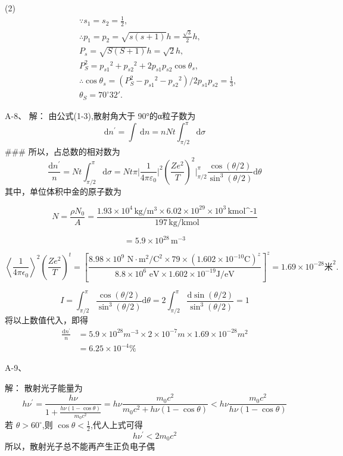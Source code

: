 \documentclass{article}
\begin{document}
\begin{CJK*}{UTF8}{gbsn}
(2)
\begin{align*}
&\because s_{1}=s_{2}=\frac{1}{2}, \\
&\therefore p_{1}=p_{2}=\sqrt{s(s+1)}h=\frac{\sqrt{3}}{2}h, \\
&P_{s}=\sqrt{S(S+1)}h=\sqrt{2}h, \\
&P_{S}^{2}={p_{s1}}^{2}+{p_{s2}}^{2}+2p_{s1}p_{s2}\cos\theta_{s}, \\
&\therefore\cos\theta_{s}=(P_{S}^{2}-{p_{s1}}^{2}-{p_{s2}}^{2})/2p_{s1}p_{s2}=\frac{1}{3}, \\
&\theta_{S}=70^{\circ}32'.
\end{align*}

A-8、
解： 由公式(1-3),散射角大于 90°的α粒子数为
$$\mathrm{d}n^{\prime}=\int\:\mathrm{d}n=nNt\int_{\pi/2}^{\pi}\mathrm{d}\sigma $$
### 所以，占总数的相对数为
$$\frac{\mathrm{d}n^{\prime}}{n}=Nt\int_{\pi/2}^{\pi}\mathrm{d}\sigma=Nt\pi\Big|\frac{1}{4\pi\varepsilon_{0}}\Big|^{2}(\frac{Ze^{2}}{T})^{2}\Big|_{\pi/2}^{\pi}\frac{\cos(\theta/2)}{\sin^{3}(\theta/2)}\mathrm{d}\theta $$
其中，单位体积中金的原子数为

\[ N = \frac{\rho N_{0}}{A} = \frac{1.93 \times 10^{4} \, \text{kg} / \text{m}^{3} \times 6.02 \times 10^{29} \times 10^{3} \, \text{kmol^{-1}}}{197 \, \text{kg} / \text{kmol}} \]

\[ = 5.9 \times 10^{28} \, \text{m}^{-3} \]

\[
\left\langle\frac{1}{4\pi\epsilon_{0}}\right\rangle^{2}\left(\frac{Ze^{2}}{T}\right)^{t} = \left[\frac{8.98\times10^{9}\text{ N}\cdot\text{m}^{2}/\text{C}^{2}\times79\times(1.602\times10^{-10}\text{C})^{z}}{8.8\times10^{6}\text{ eV}\times1.602\times10^{-19}\text{J/eV}}\right]^{z}
=1.69\times10^{-28}\text{米}^{2}.
\]

\[
I = \int_{\pi/2}^{\pi}\frac{\cos(\theta/2)}{\sin^{3}(\theta/2)}\mathrm{d}\theta = 2\int_{\pi/2}^{\pi}\frac{\mathrm{d}\sin(\theta/2)}{\sin^{3}(\theta/2)} = 1
\]
将以上数值代入，即得
$$\begin{aligned}\frac{\mathrm{d}n^{\prime}}{n}&=5.9\times10^{28}m^{-3}\times2\times10^{-7}m\times1.69\times10^{-28}m^{2}\\&=6.25\times10^{-4}\%\end{aligned}$$

A-9、

解： 散射光子能量为
$$h\nu^{\prime}=\frac{h\nu}{1+\frac{h\nu\left(1-\cos\theta\right)}{m_{0}c^{2}}}=h\nu\frac{m_{0}c^{2}}{m_{0}c^{2}+h\nu\left(1-\cos\theta\right)}<h\nu\frac{m_{0}c^{2}}{h\nu\left(1-\cos\theta\right)}$$
若 $\theta>60^{\circ}$,则 $\cos\theta<\frac12$,代人上式可得
$$h\nu^{\prime}<2m_{0}c^{2}$$
所以，散射光子总不能再产生正负电子偶


\end{CJK*}
\end{document}
